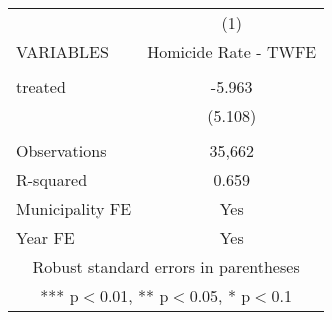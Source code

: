 \documentclass[]{article}
\begin{document}
\begin{tabular}{lc} \hline
 & (1) \\
VARIABLES & Homicide Rate - TWFE \\ \hline
 &  \\
treated & -5.963 \\
 & (5.108) \\
 &  \\
Observations & 35,662 \\
R-squared & 0.659 \\
Municipality FE & Yes \\
 Year FE & Yes \\ \hline
\multicolumn{2}{c}{ Robust standard errors in parentheses} \\
\multicolumn{2}{c}{ *** p$<$0.01, ** p$<$0.05, * p$<$0.1} \\
\end{tabular}
\end{document}
